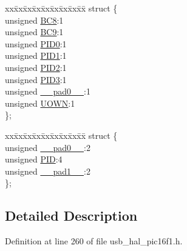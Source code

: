 \begin{DoxyCompactItemize}
\begin{tabbing}
\end{tabbing}\item 
\begin{tabbing}
xx\=xx\=xx\=xx\=xx\=xx\=xx\=xx\=xx\=\kill
struct \{\\
\>unsigned \hyperlink{union___b_d___s_t_a_t_a5d5010d284e6c86702a4ce3063f4cca5}{BC8}:1\\
\>unsigned \hyperlink{union___b_d___s_t_a_t_af499c0fe1fd8eba827eb024bf69841e9}{BC9}:1\\
\>unsigned \hyperlink{union___b_d___s_t_a_t_a810a2f6d15fc42c5d1e610b6e927d2eb}{PID0}:1\\
\>unsigned \hyperlink{union___b_d___s_t_a_t_acefd8c6eba334031c18cd877dfe08bfb}{PID1}:1\\
\>unsigned \hyperlink{union___b_d___s_t_a_t_aef3d6a9445a3c61d870212360c0a6110}{PID2}:1\\
\>unsigned \hyperlink{union___b_d___s_t_a_t_a771971768126aebea428ac7194b17fc0}{PID3}:1\\
\>unsigned \hyperlink{union___b_d___s_t_a_t_adf71f3d8410c1f1dbbc96680a92c49af}{\_\_pad0\_\_}:1\\
\>unsigned \hyperlink{union___b_d___s_t_a_t_abc982c28d59f8e36dbcb06639010169d}{UOWN}:1\\
\}; \\

\end{tabbing}\item 
\begin{tabbing}
xx\=xx\=xx\=xx\=xx\=xx\=xx\=xx\=xx\=\kill
struct \{\\
\>unsigned \hyperlink{union___b_d___s_t_a_t_adf71f3d8410c1f1dbbc96680a92c49af}{\_\_pad0\_\_}:2\\
\>unsigned \hyperlink{union___b_d___s_t_a_t_a97b41b25e06fd7857dcc6217c160a8ad}{PID}:4\\
\>unsigned \hyperlink{union___b_d___s_t_a_t_acaf2d0924a107ec6e8d2e31febaf66f9}{\_\_pad1\_\_}:2\\
\}; \\

\end{tabbing}\end{DoxyCompactItemize}


\subsection{Detailed Description}


Definition at line 260 of file usb\+\_\+hal\+\_\+pic16f1.\+h.



